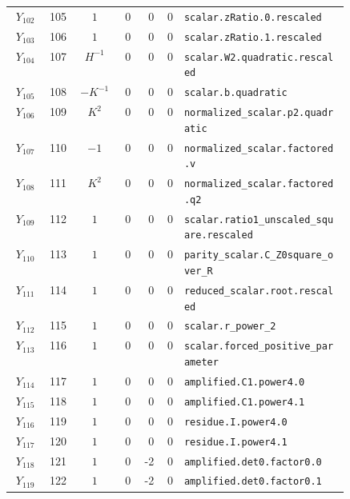 {\begin{longtable}{@{}r r c r r r p{0.49\linewidth}@{}}
\(Y_{102}\) & 105 & \(1\) & 0 & 0 & 0 & \texttt{scalar.\allowbreak{}zRatio.\allowbreak{}0.\allowbreak{}rescaled} \\
\(Y_{103}\) & 106 & \(1\) & 0 & 0 & 0 & \texttt{scalar.\allowbreak{}zRatio.\allowbreak{}1.\allowbreak{}rescaled} \\
\(Y_{104}\) & 107 & \(H^{-1}\) & 0 & 0 & 0 & \texttt{scalar.\allowbreak{}W2.\allowbreak{}quadratic.\allowbreak{}rescaled} \\
\(Y_{105}\) & 108 & \(-K^{-1}\) & 0 & 0 & 0 & \texttt{scalar.\allowbreak{}b.\allowbreak{}quadratic} \\
\(Y_{106}\) & 109 & \(K^{2}\) & 0 & 0 & 0 & \texttt{normalized\_scalar.\allowbreak{}p2.\allowbreak{}quadratic} \\
\(Y_{107}\) & 110 & \(-1\) & 0 & 0 & 0 & \texttt{normalized\_scalar.\allowbreak{}factored.\allowbreak{}v} \\
\(Y_{108}\) & 111 & \(K^{2}\) & 0 & 0 & 0 & \texttt{normalized\_scalar.\allowbreak{}factored.\allowbreak{}q2} \\
\(Y_{109}\) & 112 & \(1\) & 0 & 0 & 0 & \texttt{scalar.\allowbreak{}ratio1\_unscaled\_square.\allowbreak{}rescaled} \\
\(Y_{110}\) & 113 & \(1\) & 0 & 0 & 0 & \texttt{parity\_scalar.\allowbreak{}C\_Z0square\_over\_R} \\
\(Y_{111}\) & 114 & \(1\) & 0 & 0 & 0 & \texttt{reduced\_scalar.\allowbreak{}root.\allowbreak{}rescaled} \\
\(Y_{112}\) & 115 & \(1\) & 0 & 0 & 0 & \texttt{scalar.\allowbreak{}r\_power\_2} \\
\(Y_{113}\) & 116 & \(1\) & 0 & 0 & 0 & \texttt{scalar.\allowbreak{}forced\_positive\_parameter} \\
\(Y_{114}\) & 117 & \(1\) & 0 & 0 & 0 & \texttt{amplified.\allowbreak{}C1.\allowbreak{}power4.\allowbreak{}0} \\
\(Y_{115}\) & 118 & \(1\) & 0 & 0 & 0 & \texttt{amplified.\allowbreak{}C1.\allowbreak{}power4.\allowbreak{}1} \\
\(Y_{116}\) & 119 & \(1\) & 0 & 0 & 0 & \texttt{residue.\allowbreak{}I.\allowbreak{}power4.\allowbreak{}0} \\
\(Y_{117}\) & 120 & \(1\) & 0 & 0 & 0 & \texttt{residue.\allowbreak{}I.\allowbreak{}power4.\allowbreak{}1} \\
\(Y_{118}\) & 121 & \(1\) & 0 & -2 & 0 & \texttt{amplified.\allowbreak{}det0.\allowbreak{}factor0.\allowbreak{}0} \\
\(Y_{119}\) & 122 & \(1\) & 0 & -2 & 0 & \texttt{amplified.\allowbreak{}det0.\allowbreak{}factor0.\allowbreak{}1} \\

\end{longtable}}
